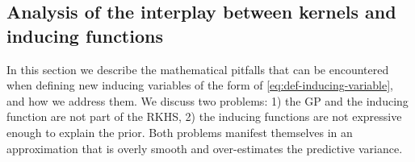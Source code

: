 \subsection{Analysis of the interplay between kernels and inducing functions}
\label{sec:zonal-kernels-and-rkhs}

In this section we describe the mathematical pitfalls that can be encountered \citep[e.g.,][]{sun2021neural} when defining new inducing variables of the form of \cref{eq:def-inducing-variable}, and how we address them. We discuss two problems: 1) the GP and the inducing function are not part of the RKHS, 2) the inducing functions are not expressive enough to explain the prior. Both problems manifest themselves in an approximation that is overly smooth and over-estimates the predictive variance.


